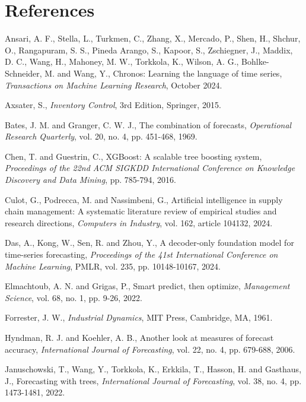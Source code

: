 \section*{References}

\begingroup
\setlength{\parskip}{1pt plus 1pt minus 1pt}

\hangindent=0.25in Ansari, A. F., Stella, L., Turkmen, C., Zhang, X., Mercado, P., Shen, H., Shchur, O., Rangapuram, S. S., Pineda Arango, S., Kapoor, S., Zschiegner, J., Maddix, D. C., Wang, H., Mahoney, M. W., Torkkola, K., Wilson, A. G., Bohlke-Schneider, M. and Wang, Y., Chronos: Learning the language of time series, \textit{Transactions on Machine Learning Research}, October 2024.

\hangindent=0.25in Axsater, S., \textit{Inventory Control}, 3rd Edition, Springer, 2015.

\hangindent=0.25in Bates, J. M. and Granger, C. W. J., The combination of forecasts, \textit{Operational Research Quarterly}, vol. 20, no. 4, pp. 451-468, 1969.

\hangindent=0.25in Chen, T. and Guestrin, C., XGBoost: A scalable tree boosting system, \textit{Proceedings of the 22nd ACM SIGKDD International Conference on Knowledge Discovery and Data Mining}, pp. 785-794, 2016.

\hangindent=0.25in Culot, G., Podrecca, M. and Nassimbeni, G., Artificial intelligence in supply chain management: A systematic literature review of empirical studies and research directions, \textit{Computers in Industry}, vol. 162, article 104132, 2024.

\hangindent=0.25in Das, A., Kong, W., Sen, R. and Zhou, Y., A decoder-only foundation model for time-series forecasting, \textit{Proceedings of the 41st International Conference on Machine Learning}, PMLR, vol. 235, pp. 10148-10167, 2024.

\hangindent=0.25in Elmachtoub, A. N. and Grigas, P., Smart predict, then optimize, \textit{Management Science}, vol. 68, no. 1, pp. 9-26, 2022.

\hangindent=0.25in Forrester, J. W., \textit{Industrial Dynamics}, MIT Press, Cambridge, MA, 1961.

\hangindent=0.25in Hyndman, R. J. and Koehler, A. B., Another look at measures of forecast accuracy, \textit{International Journal of Forecasting}, vol. 22, no. 4, pp. 679-688, 2006.

\hangindent=0.25in Januschowski, T., Wang, Y., Torkkola, K., Erkkila, T., Hasson, H. and Gasthaus, J., Forecasting with trees, \textit{International Journal of Forecasting}, vol. 38, no. 4, pp. 1473-1481, 2022.

